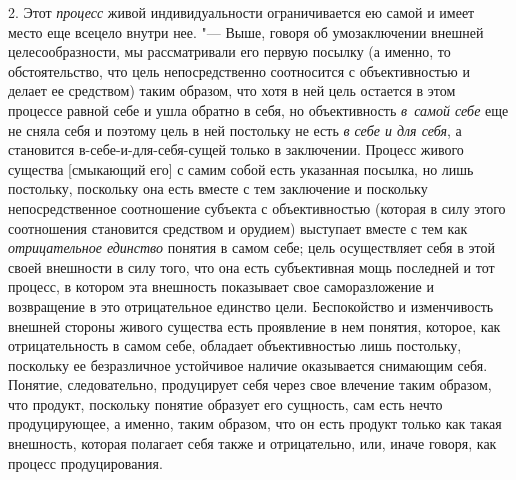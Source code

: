 2. Этот {\em процесс} живой индивидуальности ограничивается ею самой и
имеет место еще всецело внутри нее. "--- Выше, говоря об умозаключении
внешней целесообразности, мы рассматривали его первую посылку (а именно, то
обстоятельство, что цель непосредственно соотносится с объективностью и
делает ее средством) таким образом, что хотя в ней цель остается в этом
процессе равной себе и ушла обратно в себя, но объективность
{\em в~самой себе} еще не
сняла себя и поэтому цель в ней постольку не есть
{\em в себе и для себя},
а становится в-себе-и-для-себя-сущей только в заключении.
Процесс живого существа [смыкающий его] с самим собой есть указанная
посылка, но лишь постольку, поскольку она есть вместе с тем заключение и
поскольку непосредственное соотношение субъекта с объективностью (которая в
силу этого соотношения становится средством и орудием) выступает вместе с
тем как {\em отрицательное единство}
понятия в самом себе; цель осуществляет себя в этой своей
внешности в силу того, что она есть субъективная мощь последней и тот
процесс, в котором эта внешность показывает свое саморазложение
и возвращение в это отрицательное единство цели.
Беспокойство и изменчивость внешней стороны живого существа есть проявление
в нем понятия, которое, как отрицательность в самом себе, обладает
объективностью лишь постольку, поскольку ее безразличное устойчивое наличие
оказывается снимающим себя. Понятие, следовательно, продуцирует себя через
свое влечение таким образом, что продукт, поскольку понятие образует его
сущность, сам есть нечто продуцирующее, а именно, таким образом, что он
есть продукт только как такая внешность, которая полагает себя также и
отрицательно, или, иначе говоря, как процесс продуцирования.

